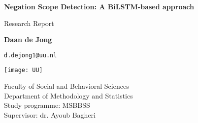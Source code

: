 \begin{titlepage}
	\begin{center}
		\vspace*{2cm}

		\huge
		\textbf{Negation Scope Detection: A BiLSTM-based approach} 
		
		\vspace{1cm}
		
		\Large
		Research Report
		
		\vspace{1.5cm}
		
		\textbf{Daan de Jong}
		
		\texttt{d.dejong1@uu.nl}

		\texttt{[image: UU]}
			
		\vfill
					
		\large
		
		Faculty of Social and Behavioral Sciences\\
		Department of Methodology and Statistics\\
		Study programme: MSBBSS\\
		Supervisor: dr. Ayoub Bagheri\\
	
			
	\end{center}


\end{titlepage}